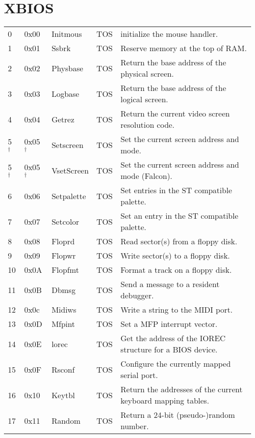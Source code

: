 \documentclass[a4paper]{article}
\begin{document}
\section{XBIOS}
\begin{supertabular}{|p{0.7cm}|p{1.1cm}|p{4.0cm}|p{1cm}|p{7.8cm}|}
0       & 0x00  & Initmous    & TOS   & initialize the mouse handler. \\
1       & 0x01  & Ssbrk       & TOS   & Reserve memory at the top of RAM. \\
2       & 0x02  & Physbase    & TOS   & Return the base address of the physical screen. \\
3       & 0x03  & Logbase     & TOS   & Return the base address of the logical screen. \\
4       & 0x04  & Getrez      & TOS   & Return the current video screen resolution code. \\
5 $^\dag$& 0x05 $^\dag$ & Setscreen   & TOS   & Set the current screen address and mode. \\
5 $^\dag$& 0x05 $^\dag$ & VsetScreen  & TOS   & Set the current screen address and mode (Falcon). \\
6       & 0x06  & Setpalette  & TOS   & Set entries in the ST compatible palette. \\
7       & 0x07  & Setcolor    & TOS   & Set an entry in the ST compatible palette. \\
8       & 0x08  & Floprd      & TOS   & Read sector(s) from a floppy disk. \\
9       & 0x09  & Flopwr      & TOS   & Write sector(s) to a floppy disk. \\
10      & 0x0A  & Flopfmt     & TOS   & Format a track on a floppy disk. \\
11      & 0x0B  & Dbmsg       & TOS   & Send a message to a resident debugger. \\
12      & 0x0c  & Midiws      & TOS   & Write a string to the MIDI port. \\
13      & 0x0D  & Mfpint      & TOS   & Set a MFP interrupt vector. \\
14      & 0x0E  & lorec       & TOS   & Get the address of the IOREC structure for a BIOS device. \\
15      & 0x0F  & Rsconf      & TOS   & Configure the currently mapped serial port. \\
16      & 0x10  & Keytbl      & TOS   & Return the addresses of the current keyboard mapping tables. \\
17      & 0x11  & Random      & TOS   & Return a 24-bit (pseudo-)random number. \\

\end{supertabular}
\end{document}
